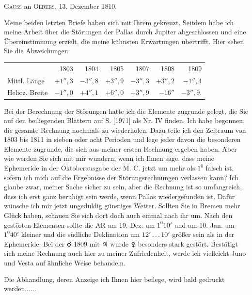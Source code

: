 \par\bigskip
{}
\begin{center}
\textsc{Gauss} an \textsc{Olbers}, 13. Dezember 1810.
\end{center}
\noindent\hspace*{\parindent}Meine beiden letzten Briefe haben sich mit Ihrem gekreuzt. Seitdem habe ich meine Arbeit über die Störungen der Pallas durch Jupiter abgeschlossen und eine Übereinstimmung erzielt, die meine kühnsten Erwartungen übertrifft. Hier sehen Sie die Abweichungen:
\begin{center}\begingroup\small\setlength{\tabcolsep}{4pt}
\begin{tabular}{lrrrrrr}
& 1803 & 1804 & 1805 & 1807 & 1808 & 1809\\
Mittl. Länge & \(+1''{,}3\) & \(-3''{,}8\) & \(+3''{,}9\) & \(-3''{,}3\) & \(+3''{,}2\) & \(-1''{,}4\)\\
Helioz. Breite & \(-1''{,}0\) & \(+4''{,}1\) & \(+6''{,}0\) & \(+3''{,}9\) & \(-16''\) & \(-3''{,}9.\)\\
\end{tabular}\endgroup\end{center}
\par
\noindent\hspace*{\parindent}Bei der Berechnung der Störungen hatte ich die Elemente zugrunde gelegt, die Sie auf den beiliegenden Blättern\HistoricalNoteEight{Band VI, S. 63.]} auf S. [1971] als Nr. IV finden. Ich habe begonnen, die gesamte Rechnung nochmals zu wiederholen. Dazu teile ich den Zeitraum von 1803 bis 1811 in sieben oder acht Perioden und lege jeder davon die besonderen Elemente zugrunde, die sich aus meiner ersten Rechnung ergeben haben. Aber wie werden Sie sich mit mir wundern, wenn ich Ihnen sage, dass meine Ephemeride in der Oktoberausgabe der M. C. jetzt um mehr als \(1^{0}\) falsch ist, sofern ich mich auf die Ergebnisse der Störungsrechnungen verlassen kann? Ich glaube zwar, meiner Sache sicher zu sein, aber die Rechnung ist so umfangreich, dass ich erst ganz beruhigt sein werde, wenn Pallas wiedergefunden ist. Dafür wünsche ich mir jetzt ungeduldig günstiges Wetter. Sollten Sie in Bremen mehr Glück haben, schauen Sie sich dort doch auch einmal nach ihr um. Nach den gestörten Elementen sollte die AR am 19. Dez. um \(1^{0}10'\) und am 10. Jan. um \(1^{0}40'\) kleiner und die südliche Deklination um \(12'\,.\,.\,.\,10'\) größer sein als in der Ephemeride. Bei der {\AstroSymbols ☌} 1809 mit {\AstroSymbols ♃} wurde {\AstroSymbols ⚴} besonders stark gestört. Bestätigt sich meine Rechnung auch hier zu meiner Zufriedenheit, werde ich vielleicht Juno und Vesta auf ähnliche Weise behandeln.
\par
\noindent\hspace*{\parindent}Die Abhandlung, deren Anzeige ich Ihnen hier beilege, wird bald gedruckt werden.\quad.\quad.\quad.\quad.\quad.
\par
